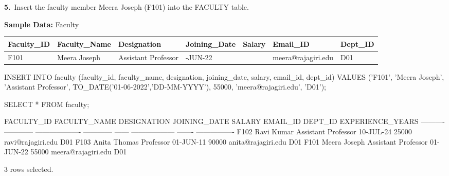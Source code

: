 \noindent\begin{minipage}{\linewidth}
\begingroup{}
{\fontsize{14}{17}\selectfont\textbf{5.}}\ Insert the faculty member Meera Joseph (F101) into the FACULTY table.\par
\endgroup\vspace{12pt}

\noindent\textbf{Sample Data:} Faculty\par
\vspace{6pt}
{\footnotesize\setlength{\tabcolsep}{4pt}
\renewcommand{\arraystretch}{1.25}
\noindent\begin{tabular}{|>{\raggedright\arraybackslash}p{56.3pt}|>{\raggedright\arraybackslash}p{70.2pt}|>{\raggedright\arraybackslash}p{84.9pt}|>{\raggedright\arraybackslash}p{64.7pt}|>{\raggedleft\arraybackslash}p{35.8pt}|>{\raggedright\arraybackslash}p{87.4pt}|>{\raggedright\arraybackslash}p{44.7pt}|}
\hline
\textbf{Faculty\_ID} & \textbf{Faculty\_Name} & \textbf{Designation} & \textbf{Joining\_Date} & \textbf{Salary} & \textbf{Email\_ID} & \textbf{Dept\_ID} \\ \hline
F101 & Meera Joseph & Assistant Professor & 01-JUN-22 & 55000 & meera@rajagiri.edu & D01 \\ \hline
\end{tabular}\par}
\vspace{14pt}

\begin{sqlcode}[fontsize=\footnotesize]
INSERT INTO faculty (faculty_id, faculty_name, designation, joining_date, salary,
                     email_id, dept_id)
VALUES ('F101', 'Meera Joseph', 'Assistant Professor', TO_DATE('01-06-2022','DD-MM-YYYY'),
        55000, 'meera@rajagiri.edu', 'D01');

SELECT * FROM faculty;
\end{sqlcode}

\vspace{18pt}


\begin{sqlout}[fontsize=\scriptsize]
FACULTY_ID  FACULTY_NAME  DESIGNATION          JOINING_DATE  SALARY  EMAIL_ID            DEPT_ID  EXPERIENCE_YEARS
----------  ------------  -------------------  ------------  ------  ------------------  -------  ----------------
F102        Ravi Kumar    Assistant Professor  10-JUL-24      25000  ravi@rajagiri.edu   D01
F103        Anita Thomas  Professor            01-JUN-11      90000  anita@rajagiri.edu  D01
F101        Meera Joseph  Assistant Professor  01-JUN-22      55000  meera@rajagiri.edu  D01

3 rows selected.
\end{sqlout}
\end{minipage}\par\vspace{24pt}

